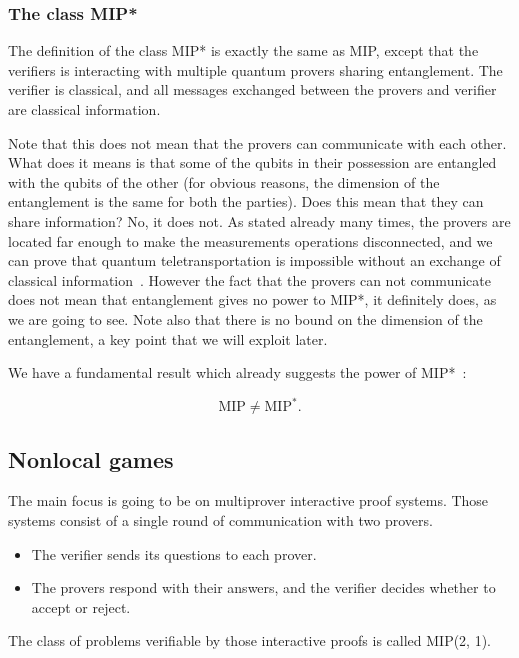 \subsubsection{The class MIP*}
The definition of the class MIP* is exactly the same as MIP, except that the verifiers is interacting with multiple quantum provers sharing entanglement. The verifier is classical, and all messages exchanged between the provers and verifier are classical information. 

Note that this does not mean that the provers can communicate with each other. What does it means is that some of the qubits in their possession are entangled with the qubits of the other (for obvious reasons, the dimension of the entanglement is the same for both the parties). Does this mean that they can share information? No, it does not. As stated already many times, the provers are located far enough to make the measurements operations disconnected, and we can prove that quantum teletransportation is impossible without an exchange of classical information~\cite{NielsenChuang}. However the fact that the provers can not communicate does not mean that entanglement gives no power to MIP*, it definitely does, as we are going to see.
Note also that there is no bound on the dimension of the entanglement, a key point that we will exploit later.

We have a fundamental result which already suggests the power of MIP*~\cite{mipre}:

\begin{theorem}
    \begin{equation}
\text{MIP} \neq \text{MIP}^{*}.
    \end{equation}
\end{theorem}

\subsection{Nonlocal games}

The main focus is going to be on multiprover interactive proof systems. Those systems consist of a single round of communication with two provers.

\begin{itemize}
    \item The verifier sends its questions to
    each prover.
    \item The provers respond with their answers, and the verifier decides whether to accept or
    reject. 
\end{itemize}
The class of problems verifiable by those interactive proofs is called MIP(2, 1).

